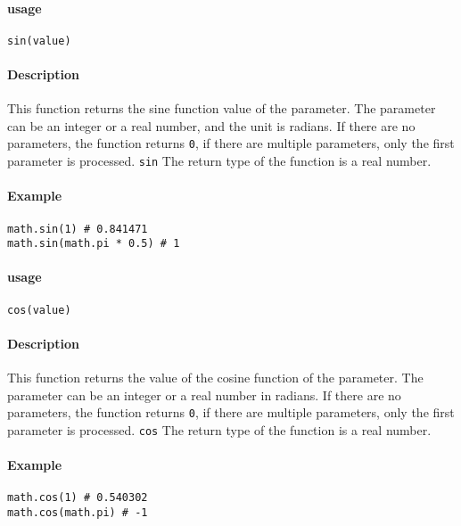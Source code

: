 \paragraph{usage}
\begin{lstlisting}[language=berry, numbers=none]
sin(value)
\end{lstlisting}

\paragraph{Description}
This function returns the sine function value of the parameter. The parameter can be an integer or a real number, and the unit is radians. If there are no parameters, the function returns \texttt{0}, if there are multiple parameters, only the first parameter is processed. \texttt{sin} The return type of the function is a real number.

\paragraph{Example}
\begin{lstlisting}[language=berry, numbers=none]
math.sin(1) # 0.841471
math.sin(math.pi * 0.5) # 1
\end{lstlisting}


\paragraph{usage}
\begin{lstlisting}[language=berry, numbers=none]
cos(value)
\end{lstlisting}

\paragraph{Description}
This function returns the value of the cosine function of the parameter. The parameter can be an integer or a real number in radians. If there are no parameters, the function returns \texttt{0}, if there are multiple parameters, only the first parameter is processed. \texttt{cos} The return type of the function is a real number.

\paragraph{Example}
\begin{lstlisting}[language=berry, numbers=none]
math.cos(1) # 0.540302
math.cos(math.pi) # -1
\end{lstlisting}

